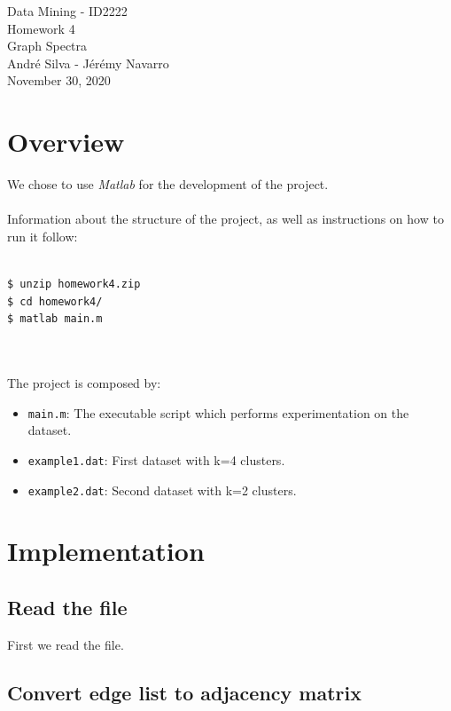 \documentclass[]{article}
\begin{document}
\begin{center}
  {\large Data Mining - ID2222}\\
  \vspace{7mm}
  {\huge Homework 4\\[1ex]}
  {\Large  Graph Spectra  }\\
  \vspace{7mm}  
  {André Silva - Jérémy Navarro\\}
  \vspace{4mm}
  {\large November 30, 2020\\}
\end{center}

\section{Overview}

We chose to use \textit{Matlab} for the development of the project.\\
\\
Information about the structure of the project, as well as instructions on how to run it follow:\\
\\
\begin{lstlisting}[language=bash]
$ unzip homework4.zip
$ cd homework4/
$ matlab main.m
\end{lstlisting}\\
\\
The project is composed by:

\begin{itemize}
    \item \texttt{main.m}: The executable script which performs experimentation on the dataset.
    \item \texttt{example1.dat}: First dataset with k=4 clusters.
    \item \texttt{example2.dat}: Second dataset with k=2 clusters.
\end{itemize}

\section{Implementation}

\subsection{Read the file}

First we read the file.

\subsection{Convert edge list to adjacency matrix}
\end{document}
